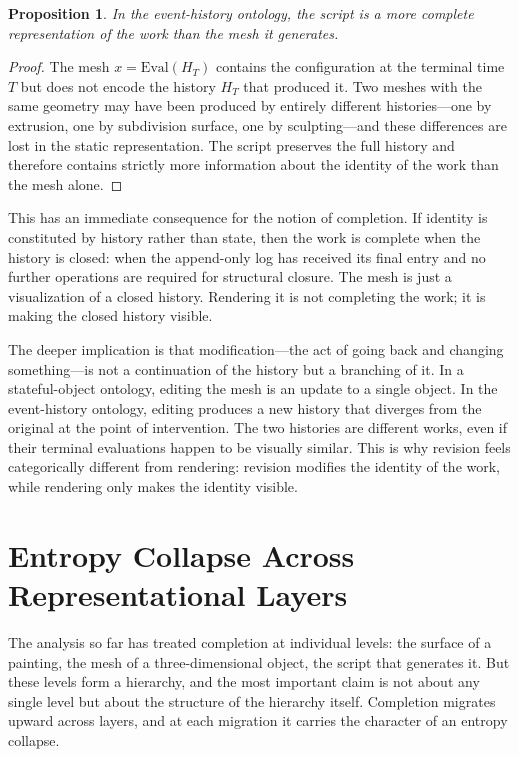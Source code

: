 \documentclass[11pt, twoside]{article}
\theoremstyle{plain}
\newtheorem{proposition}[theorem]{Proposition}
\theoremstyle{definition}
\theoremstyle{remark}
\begin{document}
\begin{proposition}
\label{prop:script-primacy}
In the event-history ontology, the script is a more complete representation of the work than the mesh it generates.
\end{proposition}

\begin{proof}
The mesh $x = \text{Eval}(H_T)$ contains the configuration at the terminal time $T$ but does not encode the history $H_T$ that produced it. Two meshes with the same geometry may have been produced by entirely different histories---one by extrusion, one by subdivision surface, one by sculpting---and these differences are lost in the static representation. The script preserves the full history and therefore contains strictly more information about the identity of the work than the mesh alone.
\end{proof}

This has an immediate consequence for the notion of completion. If identity is constituted by history rather than state, then the work is complete when the history is closed: when the append-only log has received its final entry and no further operations are required for structural closure. The mesh is just a visualization of a closed history. Rendering it is not completing the work; it is making the closed history visible.

The deeper implication is that modification---the act of going back and changing something---is not a continuation of the history but a branching of it. In a stateful-object ontology, editing the mesh is an update to a single object. In the event-history ontology, editing produces a new history that diverges from the original at the point of intervention. The two histories are different works, even if their terminal evaluations happen to be visually similar. This is why revision feels categorically different from rendering: revision modifies the identity of the work, while rendering only makes the identity visible.

\section{Entropy Collapse Across Representational Layers}
\label{sec:entropy-collapse}

The analysis so far has treated completion at individual levels: the surface of a painting, the mesh of a three-dimensional object, the script that generates it. But these levels form a hierarchy, and the most important claim is not about any single level but about the structure of the hierarchy itself. Completion migrates upward across layers, and at each migration it carries the character of an entropy collapse.
\end{document}
